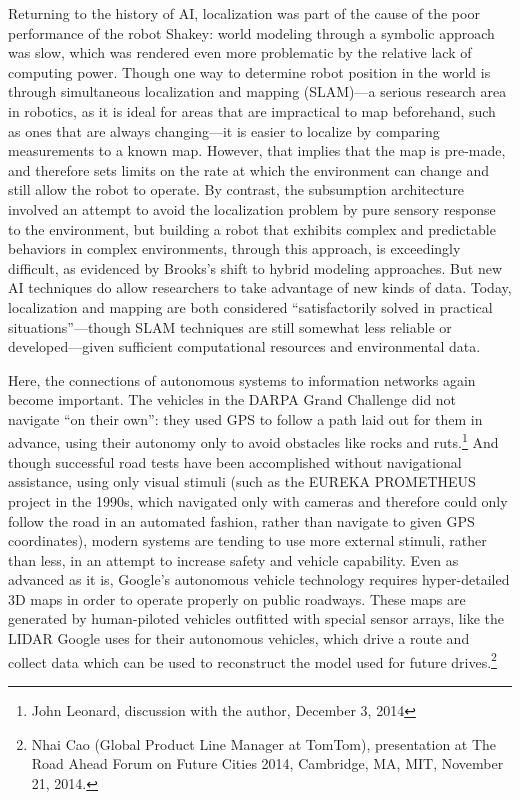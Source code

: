 Returning to the history of AI,
localization was part of the cause of the poor performance of the
robot Shakey: world modeling through a symbolic approach was slow,
which was rendered even more problematic by the relative lack of
computing power.\cite[Afterword]{mccorduck}
Though one way to determine robot position in the world is through
simultaneous localization and mapping (SLAM)---a serious research area in
robotics, as it is ideal for areas that are impractical to map
beforehand, such as ones that are always changing---it is easier to localize by comparing
measurements to a known map. However, that implies that the map is
pre-made, and therefore sets limits on the rate at which the
environment can change and still allow the robot to operate. By
contrast, the subsumption architecture involved an
attempt to avoid the localization problem by pure sensory response to
the environment, but building a robot that exhibits complex and
predictable behaviors in complex environments, through this approach,
is exceedingly difficult, as evidenced by Brooks's shift to hybrid
modeling approaches. But new AI techniques do allow researchers to
take advantage of new kinds of data.\cite{???} Today, localization and
mapping are both considered ``satisfactorily solved in practical
situations''---though SLAM techniques
are still somewhat less reliable or developed---given sufficient
computational resources and environmental data.\cite[p.
  5-6]{SLAMbook}


Here, the connections of autonomous systems to information networks
again become important. The vehicles in the
DARPA Grand Challenge did not navigate ``on their own'': they used GPS
to follow a path laid out for them in advance, using their autonomy
only to avoid obstacles like rocks and ruts.\footnote{John Leonard,
  discussion with the author, December 3, 2014} And though successful
road tests have been accomplished without navigational assistance,
using only visual stimuli (such as the EUREKA PROMETHEUS project
in the 1990s, which navigated only with cameras and therefore could
only follow the road in an automated fashion, rather than navigate to
given GPS coordinates)\cite{UlmerVITA}, modern systems are tending to use more external
stimuli, rather than less, in an attempt to increase safety and
vehicle capability. Even as
advanced as it is, Google's autonomous vehicle technology requires
hyper-detailed 3D maps in order to operate properly on public
roadways.\cite{gomesObstacles} These maps are generated by human-piloted vehicles outfitted with
special sensor arrays, like the LIDAR Google uses for their autonomous
vehicles, which drive a route and collect data which can be used to
reconstruct the model used for future drives.\footnote{Nhai Cao
  (Global Product Line Manager at TomTom), presentation at The Road
  Ahead Forum on Future Cities 2014, Cambridge, MA, MIT, November 21, 2014.} 

